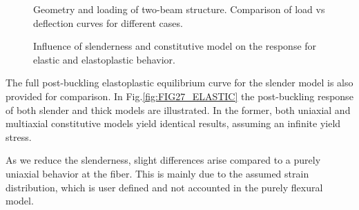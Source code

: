 \clearpage
\begin{figure}[t]
	\centering
	\caption{Geometry and loading of two-beam structure. Comparison of load vs 
		deflection curves for different cases.}
	\label{fig:FIG26}
\end{figure} 

\begin{figure}[b]
	\centering
	\caption{Influence of slenderness and constitutive model on the response 
		for elastic and elastoplastic behavior.}
	\label{fig:FIG27}
\end{figure} 

\clearpage
 The full post-buckling elastoplastic equilibrium curve for 
the slender model is also provided for comparison. In 
Fig.\ref{fig:FIG27_ELASTIC} the post-buckling response of both slender and 
thick 
models are illustrated. In the former, both uniaxial and multiaxial 
constitutive models yield identical results, assuming an infinite yield stress.

As we reduce the slenderness, slight differences arise compared to a purely 
uniaxial behavior at the fiber. This is mainly due to the assumed strain 
distribution, which is user defined and not accounted in the purely flexural 
model.


